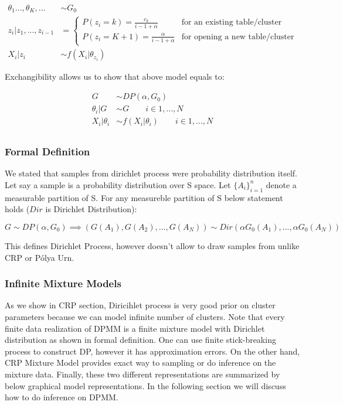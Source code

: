 \documentclass[a4paper]{article}
\begin{document}
\begin{align*}
\theta_1...,\theta_K,... &\sim G_0 \\
z_i|z_1,...,z_{i-1} &= \begin{cases}
P(z_i=k)=\frac{c_k}{i-1+\alpha} & \text{for an existing table/cluster} \\
P(z_i=K+1)=\frac{\alpha}{i-1+\alpha} & \text{for opening a new table/cluster}
\end{cases}\\
X_i|z_i &\sim f(X_i|\theta_{z_i})
\end{align*}

Exchangibility allows us to show that above model equals to\cite{blackwell1973ferguson}:

\begin{align*}
G &\sim DP(\alpha,G_0)  \\
\theta_i|G &\sim G \qquad i \in 1,...,N \\
X_i|\theta_i &\sim  f(X_i|\theta_i) \qquad i \in 1,...,N \\
\end{align*}

\subsubsection{Formal Definition}

We stated that samples from dirichlet process were probability
distribution itself. Let say a sample is a probability distribution over
S space. Let \(\{A_i\}_{i=1}^n\) denote a measurable partition of S. For
any measureble partition of S below statement holds (\(Dir\) is
Dirichlet Distribution):

\begin{equation*}
G \sim DP(\alpha,G_0) \implies  (G(A_1),G(A_2),...,G(A_N)) \sim Dir(\alpha G_0(A_1),...,\alpha G_0(A_N))
\end{equation*}

This defines Dirichlet Process, however doesn't allow to draw samples
from unlike CRP or Pólya Urn.


\subsubsection{Infinite Mixture Models}

As we show in CRP section, Diricihlet process is very good prior on
cluster parameters because we can model infinite number of clusters.
Note that every finite data realization of DPMM is a finite mixture
model with Dirichlet distribution as shown in formal definition. One can
use finite stick-breaking process to construct DP, however it has
approximation errors. On the other hand, CRP Mixture Model provides
exact way to sampling or do inference on the mixture data. Finally,
these two different representations are summarized by below graphical
model representations. In the following section we will discuss how to
do inference on DPMM.
\end{document}
